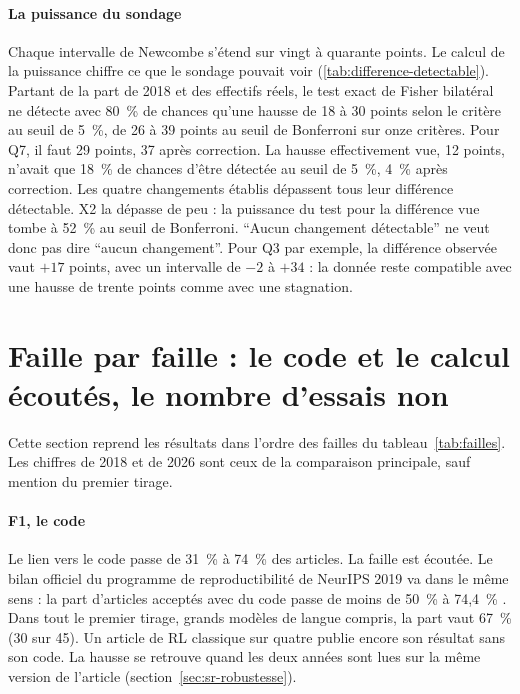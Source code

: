 \paragraph{La puissance du sondage}
Chaque intervalle de Newcombe s'étend sur vingt à quarante points. Le calcul de la puissance chiffre
ce que le sondage pouvait voir (\cref{tab:difference-detectable}). Partant de la part de 2018 et des
effectifs réels, le test exact de Fisher bilatéral ne détecte avec 80~\% de chances qu'une hausse de 18 à 30
points selon le critère au seuil de 5~\%, de 26 à 39 points au seuil de Bonferroni sur onze critères. Pour Q7,
il faut 29 points, 37 après correction. La hausse effectivement vue, 12 points, n'avait que 18~\% de chances
d'être détectée au seuil de 5~\%, 4~\% après correction. Les quatre changements établis dépassent tous leur
différence détectable. X2 la dépasse de peu : la puissance du test pour la différence vue tombe à 52~\% au seuil de
Bonferroni. \enquote{Aucun changement détectable} ne veut donc pas dire \enquote{aucun changement}. Pour Q3 par
exemple, la différence observée vaut $+17$ points, avec un intervalle de $-2$ à $+34$ : la donnée reste compatible
avec une hausse de trente points comme avec une stagnation.


\section{Faille par faille : le code et le calcul écoutés, le nombre d'essais non}\label{sec:sr-failles}

Cette section reprend les résultats dans l'ordre des failles du tableau~\ref{tab:failles}. Les chiffres de 2018
et de 2026 sont ceux de la comparaison principale, sauf mention du premier tirage.

\paragraph{F1, le code}
Le lien vers le code passe de 31~\% à 74~\% des articles. La faille est écoutée. Le bilan officiel du
programme de reproductibilité de NeurIPS 2019 va dans le même sens : la part d'articles acceptés avec
du code passe de moins de 50~\% à 74,4~\% \parencite{pineau2021improving}. Dans tout le premier tirage,
grands modèles de langue compris, la part vaut 67~\% (30 sur 45). Un article de RL classique sur quatre
publie encore son résultat sans son code. La hausse se retrouve quand les deux années sont lues sur la même version
de l'article (section~\ref{sec:sr-robustesse}).

